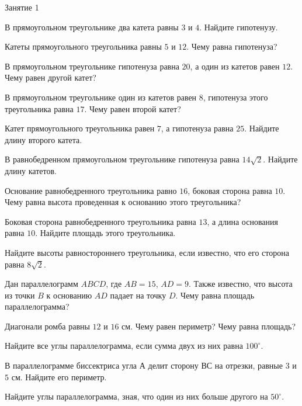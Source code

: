 %
%

\begin{class}[number=1]
	\begin{listofex}
		\item Занятие 1
	\end{listofex}
\end{class}

\begin{class}[number=2]
	\begin{listofex}
		\item В прямоугольном треугольнике два катета равны \( 3 \) и \(  4 \). Найдите гипотенузу.
		\item Катеты прямоугольного треугольника равны \( 5 \) и \( 12 \). Чему равна гипотенуза?
		\item В прямоугольном треугольнике гипотенуза равна \( 20 \), а один из катетов равен \( 12 \). Чему равен другой катет?
		\item В прямоугольном треугольнике один из катетов равен \( 8 \), гипотенуза этого треугольника равна \( 17 \). Чему равен второй катет?
		\item Катет прямоугольного треугольника равен \( 7 \), а гипотенуза равна \( 25 \). Найдите длину второго катета.
		\item В равнобедренном прямоугольном треугольнике гипотенуза равна  \( 14\sqrt{2} \). Найдите длину катетов.
		\item Основание равнобедренного треугольника равно \( 16 \), боковая сторона равна \( 10 \). Чему равна высота проведенная к основанию этого треугольника?
		\item Боковая сторона равнобедренного треугольника равна \( 13 \), а длина основания равна \( 10 \). Найдите площадь этого треугольника.
		\item Найдите высоты равностороннего треугольника, если известно, что его сторона равна \( 8\sqrt{2} \).
		\item Дан параллелограмм \( ABCD \), где \( AB=15 \), \( AD=9 \). Также известно, что высота из точки \( B \) к основанию \( AD \) падает на точку \( D \). Чему равна площадь параллелограмма?
		\item Диагонали ромба равны \( 12 \) и \( 16 \) см. Чему равен периметр? Чему равна площадь? 
		\item Найдите все углы параллелограмма, если сумма двух из них равна \( 100^{\circ}\).
		\item В параллелограмме биссектриса угла \( А \) делит сторону \( ВС  \) на отрезки, равные \( 3 \) и \( 5  \) см. Найдите его периметр.
		\item Найдите углы параллелограмма, зная, что один из них больше другого на \( 50^{\circ} \).
	\end{listofex}
\end{class}

